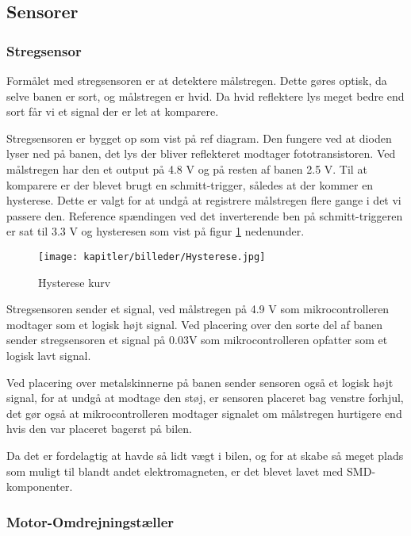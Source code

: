 
\subsection{Sensorer}


\subsubsection{Stregsensor}
Formålet med stregsensoren er at detektere målstregen. Dette gøres optisk, da selve banen er sort, og målstregen er hvid. Da hvid reflektere lys meget bedre end sort får vi et signal der er let at komparere.

Stregsensoren er bygget op som vist på ref diagram. Den fungere ved at dioden lyser ned på banen, det lys der bliver reflekteret modtager fototransistoren. Ved målstregen har den et output på 4.8 V og på resten af banen 2.5 V. Til at komparere er der blevet brugt en schmitt-trigger, således at der kommer en hysterese. Dette er valgt for at undgå at registrere målstregen flere gange i det vi passere den. Reference spændingen ved det inverterende ben på schmitt-triggeren er sat til 3.3 V og hysteresen som vist på figur \ref{fig:hys} nedenunder.

\begin{figure}[ht]
	\centering
	\texttt{[image: kapitler/billeder/Hysterese.jpg]}
	\caption{Hysterese kurv}
	\label{fig:hys}
\end{figure}

Stregsensoren sender et signal, ved målstregen på 4.9 V som  mikrocontrolleren modtager som et logisk højt signal. Ved placering over den sorte del af banen sender stregsensoren et signal på 0.03V som mikrocontrolleren opfatter som et logisk lavt signal.

Ved placering over metalskinnerne på banen sender sensoren også et logisk højt signal, for at undgå at modtage den støj, er sensoren placeret bag venstre forhjul, det gør også at mikrocontrolleren modtager signalet om målstregen hurtigere end hvis den var placeret bagerst på bilen.

Da det er fordelagtig at havde så lidt vægt i bilen, og for at skabe så meget plads som muligt til blandt andet elektromagneten, er det blevet lavet med SMD-komponenter.


\subsubsection{Motor-Omdrejningstæller}
\label{motor-omdrej}

